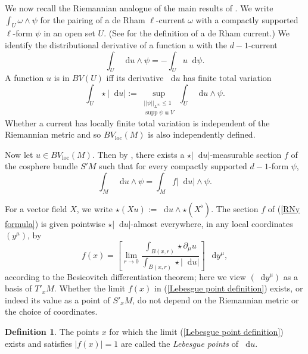 \documentclass[reqno,12pt,letterpaper]{amsart}
\DeclareMathOperator{\supp}{supp}
\newcommand*\dif{\mathop{}\!\mathrm{d}}
\newcommand{\dfn}[1]{\emph{#1}\index{#1}}
\newcommand{\loc}{\mathrm{loc}}
\theoremstyle{definition}
\newtheorem{definition}[theorem]{Definition}
\numberwithin{equation}{section}
\begin{document}
We now recall the Riemannian analogue of the main results of \cite[Chapter 1]{Giusti77}.
We write $\int_U \omega \wedge \psi$ for the pairing of a de Rham $\ell$-current $\omega$ with a compactly supported $\ell$-form $\psi$ in an open set $U$. (See \cite{simon1983GMT} for the definition of a de Rham current.)
We identify the distributional derivative of a function $u$ with the $d-1$-current
$$\int_U \dif u \wedge \psi = -\int_U u \dif \psi.$$
A function $u$ is in $BV(U)$ iff its derivative $\dif u$ has finite total variation
\begin{equation}\label{total variation}
\int_U \star |\dif u| := \sup_{\substack{||\psi||_{L^\infty} \leq 1\\\supp \psi \Subset V}} \int_U \dif u \wedge \psi.
\end{equation}
Whether a current has locally finite total variation is independent of the Riemannian metric and so $BV_\loc(M)$ is also independently defined.

Now let $u \in BV_\loc(M)$.
Then by \cite[Theorem 4.14]{simon1983GMT}, there exists a $\star |\dif u|$-measurable section $f$ of the cosphere bundle $S'M$ such that for every compactly supported $d-1$-form $\psi$,
\begin{equation}\label{RNy formula}
\int_M \dif u \wedge \psi = \int_M f|\dif u| \wedge \psi.
\end{equation}

For a vector field $X$, we write $\star (Xu) := \dif u \wedge \star (X^\flat)$.
The section $f$ of (\ref{RNy formula}) is given pointwise $\star |\dif u|$-almost everywhere, in any local coordinates $(y^\mu)$, by
\begin{equation}\label{Lebesgue point definition}
    f(x) = \left[\lim_{r \to 0} \frac{\int_{B(x, r)} \star \partial_\mu u}{\int_{B(x, r)} \star |\dif u|}\right] ~\dif y^\mu,
\end{equation}
according to the Besicovitch differentiation theorem; here we view $(\dif y^\mu)$ as a basis of $T'_xM$.
Whether the limit $f(x)$ in (\ref{Lebesgue point definition}) exists, or indeed its value as a point of $S'_xM$, do not depend on the Riemannian metric or the choice of coordinates.

\begin{definition}
The points $x$ for which the limit (\ref{Lebesgue point definition}) exists and satisfies $|f(x)| = 1$ are called the \dfn{Lebesgue points} of $\dif u$.
\end{definition}
\end{document}
